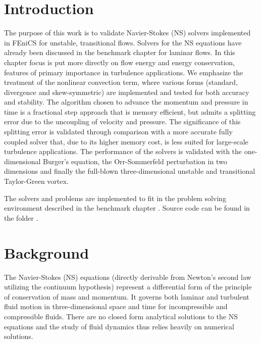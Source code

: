 


\section{Introduction}
The purpose of this work is to validate Navier-Stokes (NS) solvers implemented in FEniCS for unstable, transitional flows. Solvers for the NS equations have already been discussed in the benchmark chapter \cite{nsbench} for laminar flows. In this chapter focus is put more directly on flow energy and energy conservation, features of primary importance in turbulence applications. We emphasize the treatment of the nonlinear convection term, where various forms (standard, divergence and skew-symmetric) are implemented and tested for both accuracy and stability. The algorithm chosen to advance the momentum and pressure in time is a fractional step approach that is memory efficient, but admits a splitting error due to the uncoupling of velocity and pressure. The significance of this splitting error is validated through comparison with a more accurate fully coupled solver that, due to its higher memory cost, is less suited for large-scale turbulence applications. The performance of the solvers is validated with the one-dimensional Burger's equation, the Orr-Sommerfeld perturbation in two dimensions and finally the full-blown three-dimensional unstable and transitional Taylor-Green vortex.

The solvers and problems are implemented to fit in the problem solving environment described in the benchmark chapter \cite{nsbench}. Source code can be found in the folder \cite{folder}.

\section{Background}

The Navier-Stokes (NS) equations (directly derivable from Newton's second law utilizing the continuum hypothesis) represent a differential form of the principle of conservation of mass and momentum. It governs both laminar and turbulent fluid motion in three-dimensional space and time for incompressible and compressible fluids. There are no closed form analytical solutions to the NS equations and the study of fluid dynamics thus relies heavily on numerical solutions.

